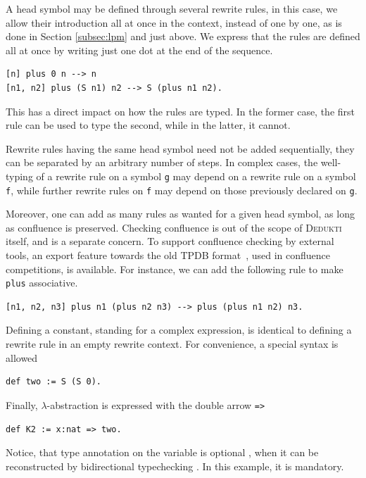 \documentclass[english]{lipics}
\newcommand\lst[1]{{\rm \lstinline{#1}}}
\begin{document}
A head symbol may be defined through several rewrite rules, in
this case, we allow their introduction all at once in the context,
instead of one by one, as is done in Section
\ref{subsec:lpm} and just above.
We express that the rules are defined all at once by writing just one
dot at the end of the sequence.
\begin{lstlisting}
[n] plus 0 n --> n
[n1, n2] plus (S n1) n2 --> S (plus n1 n2).
\end{lstlisting}

This has a direct impact on how the rules are typed. In the former
case, the first rule can be used to type the second, while
in the latter, it cannot.

Rewrite rules having the same head symbol need
not be added sequentially, they can be separated by an arbitrary
number of steps. In complex cases, the well-typing of a rewrite rule
on a symbol \lst{g} may depend on a rewrite rule on a symbol
\lst{f},
while further rewrite rules on \lst{f} may depend on those previously
declared on \lst{g}.

Moreover, one can add as many rules as wanted for a given head symbol, as
long as confluence is preserved. Checking confluence is out
of the scope of \textsc{Dedukti} itself, and is a separate concern. To
support confluence checking by external tools, an export feature
towards the old TPDB format~\cite{TPDB}, used in confluence competitions,
is available.
For instance, we can add the following rule to make \lst{plus} associative.
\begin{lstlisting}
[n1, n2, n3] plus n1 (plus n2 n3) --> plus (plus n1 n2) n3.
\end{lstlisting}

Defining a constant, standing for a complex expression, is identical
to defining a rewrite rule in an empty rewrite context. For
convenience, a special syntax is allowed
\begin{lstlisting}
def two := S (S 0).
\end{lstlisting}

Finally, $\lambda$-abstraction is expressed with the double arrow
\lst{=>}

\begin{lstlisting}
def K2 := x:nat => two.
\end{lstlisting}

Notice, that type annotation on the variable is optional
\cite{GBarMHei93}, when it can be reconstructed by bidirectional
typechecking
\cite{MBoeQCarOHer12,AChlLPetRHar05,TCoq96}. In this example, it is
mandatory.
\end{document}
